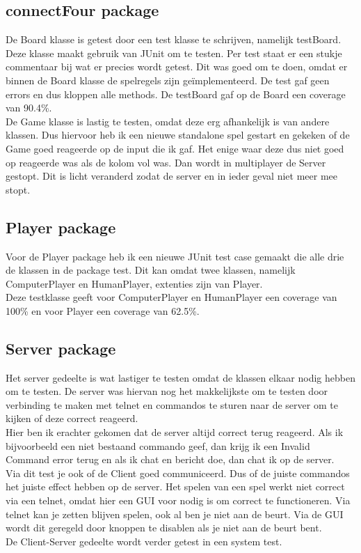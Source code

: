\documentclass[12pt]{article}
\begin{document}
\subsection{connectFour package}
De Board klasse is getest door een test klasse te schrijven, namelijk testBoard. Deze klasse maakt gebruik van JUnit om te testen. Per test staat er een stukje commentaar bij wat er precies wordt getest. Dit was goed om te doen, omdat er binnen de Board klasse de spelregels zijn ge\"implementeerd. De test gaf geen errors en dus kloppen alle methods. De testBoard gaf op de Board een coverage van 90.4\%.\\
De Game klasse is lastig te testen, omdat deze erg afhankelijk is van andere klassen. Dus hiervoor heb ik een nieuwe standalone spel gestart en gekeken of de Game goed reageerde op de input die ik gaf. Het enige waar deze dus niet goed op reageerde was als de kolom vol was. Dan wordt in multiplayer de Server gestopt. Dit is licht veranderd zodat de server en in ieder geval niet meer mee stopt.

\subsection{Player package}
Voor de Player package heb ik een nieuwe JUnit test case gemaakt die alle drie de klassen in de package test. Dit kan omdat twee klassen, namelijk ComputerPlayer en HumanPlayer, extenties zijn van Player.\\
Deze testklasse geeft voor ComputerPlayer en HumanPlayer een coverage van 100\% en voor Player een coverage van 62.5\%.

\subsection{Server package}
Het server gedeelte is wat lastiger te testen omdat de klassen elkaar nodig hebben om te testen. De server was hiervan nog het makkelijkste om te testen door verbinding te maken met telnet en commandos te sturen naar de server om te kijken of deze correct reageerd.\\
Hier ben ik erachter gekomen dat de server altijd correct terug reageerd. Als ik bijvoorbeeld een niet bestaand commando geef, dan krijg ik een Invalid Command error terug en als ik chat en bericht doe, dan chat ik op de server.\\
Via dit test je ook of de Client goed communiceerd. Dus of de juiste commandos het juiste effect hebben op de server. Het spelen van een spel werkt niet correct via een telnet, omdat hier een GUI voor nodig is om correct te functioneren. Via telnet kan je zetten blijven spelen, ook al ben je niet aan de beurt. Via de GUI wordt dit geregeld door knoppen te disablen als je niet aan de beurt bent.\\
De Client-Server gedeelte wordt verder getest in een system test.
\end{document}
